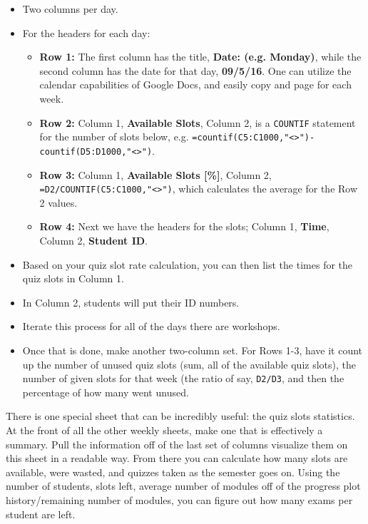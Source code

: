 \documentclass[12pt]{article}
\begin{document}
\begin{itemize}
	\item Two columns per day.
	\item For the headers for each day:
		\begin{itemize}
			\item \textbf{Row 1:} The first column has the title, \textbf{Date: (e.g. Monday)}, while the second column has the date for that day, \textbf{09/5/16}. One can utilize the calendar capabilities of Google Docs, and easily copy and page for each week.
			\item \textbf{Row 2:} Column 1, \textbf{Available Slots}, Column 2, is a \texttt{COUNTIF} statement for the number of slots below, e.g. \texttt{=countif(C5:C1000,"<>")-countif(D5:D1000,"<>")}.
			\item \textbf{Row 3:} Column 1, \textbf{Available Slots [\%]}, Column 2, \texttt{=D2/COUNTIF(C5:C1000,"<>")}, which calculates the average for the Row 2 values.
			\item \textbf{Row 4:} Next we have the headers for the slots; Column 1, \textbf{Time}, Column 2, \textbf{Student ID}.
		\end{itemize}
	\item Based on your quiz slot rate calculation, you can then list the times for the quiz slots in Column 1.
	\item In Column 2, students will put their ID numbers.
	\item Iterate this process for all of the days there are workshops.
	\item Once that is done, make another two-column set. For Rows 1-3, have it count up the number of unused quiz slots (sum, all of the available quiz slots), the number of given slots for that week (the ratio of say, \texttt{D2/D3}, and then the percentage of how many went unused.
\end{itemize}

\indent There is one special sheet that can be incredibly useful: the quiz slots statistics. At the front of all the other weekly sheets, make one that is effectively a summary. Pull the information off of the last set of columns visualize them on this sheet in a readable way. From there you can calculate how many slots are available, were wasted, and quizzes taken as the semester goes on. Using the number of students, slots left, average number of modules off of the progress plot history/remaining number of modules, you can figure out how many exams per student are left.
\end{document}
